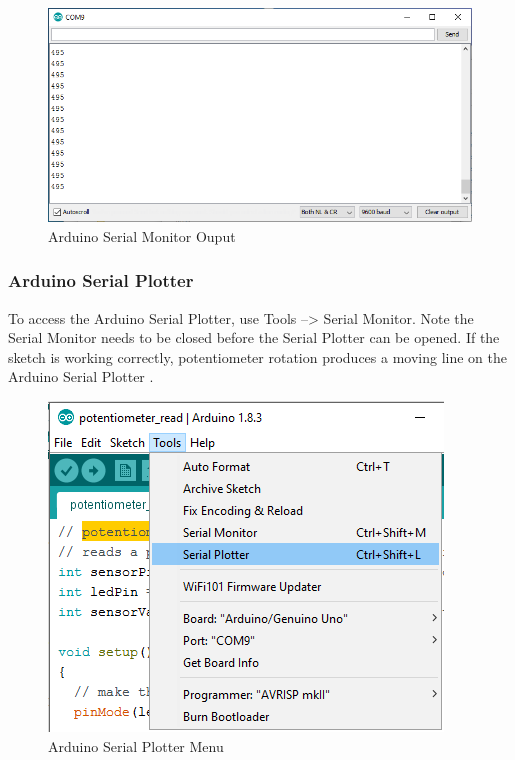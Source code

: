 \documentclass{book}
\makeatletter
\def\maxwidth{\ifdim\Gin@nat@width>\linewidth\linewidth
    \else\Gin@nat@width\fi}
\let\Oldincludegraphics\includegraphics
\renewcommand{\includegraphics}[1]{\Oldincludegraphics[width=.8\maxwidth]{#1}}
\makeatother
\begin{document}
\begin{figure}
\centering
\includegraphics{images/serial_monitor_output.png}
\caption{Arduino Serial Monitor Ouput}
\end{figure}
    




    
        \subsubsection{Arduino Serial Plotter}\label{arduino-serial-plotter}

To access the Arduino Serial Plotter, use Tools --\textgreater{} Serial
Monitor. Note the Serial Monitor needs to be closed before the Serial
Plotter can be opened. If the sketch is working correctly, potentiometer
rotation produces a moving line on the Arduino Serial Plotter .

\begin{figure}
\centering
\includegraphics{images/Tools_SerialPlotter.png}
\caption{Arduino Serial Plotter Menu}
\end{figure}
\end{document}
